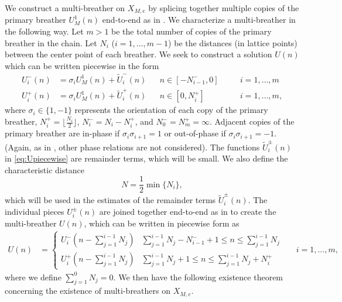 \documentclass[12pt,reqno]{amsart}
\begin{document}
We construct a multi-breather on $X_{M,e}$ by splicing together multiple copies of the primary breather $U^1_M(n)$ end-to-end as in \cites{Parker2020,Sandstede1998}. We characterize a multi-breather in the following way. Let $m > 1$ be the total number of copies of the primary breather in the chain. Let $N_i$ ($i = 1, \dots, m-1$) be the distances (in lattice points) between the center point of each breather. We seek to construct a solution $U(n)$ which can be written piecewise in the form
\begin{equation}\label{eq:Upiecewise}
\begin{aligned}
U_i^-(n) &= \sigma_i U^1_M(n) + \tilde{U}_i^-(n) && n \in [-N_{i-1}^-, 0] && \quad i = 1, \dots, m\\
U_i^+(n) &= \sigma_i U^1_M(n) + \tilde{U}_i^+(n) && n \in [0, N_i^+] && \quad i = 1, \dots, m,
\end{aligned}
\end{equation}
where $\sigma_i \in \{1, -1\}$ represents the orientation of each copy of the primary breather, $N_i^+ = \lfloor \frac{N_i}{2} \rfloor$, $N_i^- = N_i - N_i^+$, and $N_0^- = N_m^+ = \infty$. Adjacent copies of the primary breather are in-phase if $\sigma_i \sigma_{i+1} = 1$ or out-of-phase if $\sigma_i \sigma_{i+1} = -1$. (Again, as in \cite{Pelinovsky2012}, other phase relations are not considered). The functions $\tilde{U}_i^\pm(n)$ in \cref{eq:Upiecewise} are remainder terms, which will be small. We also define the characteristic distance
\begin{equation}\label{defN}
N = \frac{1}{2} \min\{ N_i \},
\end{equation}
which will be used in the estimates of the remainder terms $\tilde{U}_i^\pm(n)$. The individual pieces $U_i^\pm(n)$ are joined together end-to-end as in \cites{Sandstede1998,Knobloch2000,Parker2020,Parker2021} to create the multi-breather $U(n)$, which can be written in piecewise form as
\begin{equation}
\begin{aligned}
U(n) &= \begin{cases}
U_i^-\left( n - \sum_{j=1}^{i-1}N_j \right) & \sum_{j=1}^{i-1}N_j - N_{i-1}^- + 1 \leq n \leq \sum_{j=1}^{i-1}N_j \\
U_i^+\left( n - \sum_{j=1}^{i-1}N_j \right) & \sum_{j=1}^{i-1}N_j + 1 \leq n \leq \sum_{j=1}^{i-1}N_j + N_i^+
\end{cases}
&& i = 1, \dots, m,
\end{aligned}
\end{equation}
where we define $\sum_{j=1}^0 N_j = 0$. We then have the following existence theorem concerning the existence of multi-breathers on $X_{M,e}$. 
\end{document}

